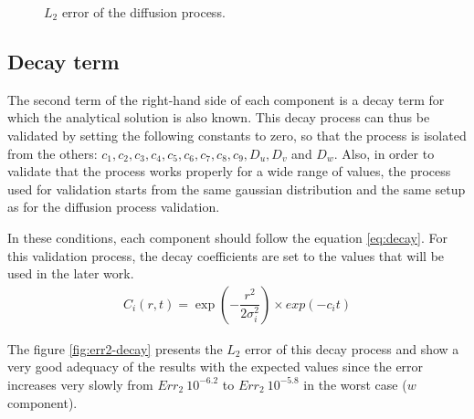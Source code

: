 \documentclass[a4paper]{article}
\begin{document}
\begin{figure}
\label{fig:err2-diffusion}
\caption{$L_2$ error of the diffusion process.}
\end{figure}


\subsection{Decay term}
\label{ssec:decay}

The second term of the right-hand side of each component is a decay term for which the analytical solution is also known. This decay process can thus be validated by setting the following constants to zero, so that the process is isolated from the others: $c_1, c_2, c_3, c_4, c_5, c_6, c_7, c_8, c_9, D_u, D_v$ and $D_w$. Also, in order to validate that the process works properly for a wide range of values, the process used for validation starts from the same gaussian distribution and the same setup as for the diffusion process validation.

In these conditions, each component should follow the equation \ref{eq:decay}. For this validation process, the decay coefficients are set to the values that will be used in the later work.
\begin{align}
\label{eq:decay}
	C_i(r, t)= \exp \left(- \dfrac{r^2}{2 \sigma^2_i} \right) \times exp(-c_i t)
\end{align}

The figure \ref{fig:err2-decay} presents the $L_2$ error of this decay process and show a very good adequacy of the results with the expected values since the error increases very slowly from $Err_2 ~ 10^{-6.2}$ to $Err_2 ~ 10^{-5.8}$ in the worst case ($w$ component).
\end{document}
